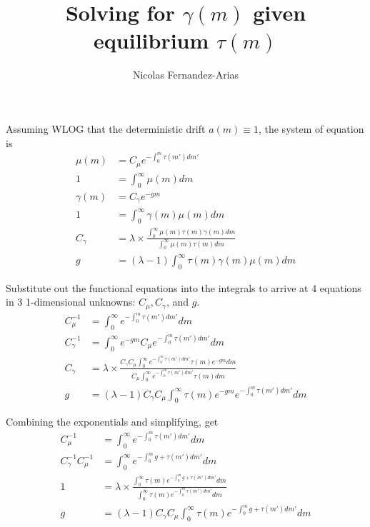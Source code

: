 \documentclass[12pt,english]{article}
\theoremstyle{remark}
\begin{document}
	
	\title{Solving for $\gamma(m)$ given equilibrium $\tau(m)$}
	\author{Nicolas Fernandez-Arias}
	\maketitle

Assuming WLOG that the deterministic drift $a(m) \equiv 1$, the system of equation is
\begin{align*}
	\mu(m) &= C_{\mu} e^{  -\int_{0}^{m} \tau(m') dm'} \\
	1 &= \int_{0}^{\infty} \mu(m) dm \\
	\gamma(m) &= C_{\gamma} e^{-gm} \\
	1 &= \int_{0}^{\infty}\gamma(m) \mu(m) dm \\ 
	C_{\gamma} &= \lambda \times \frac{\int_{0}^{\infty} \mu(m) \tau(m) \gamma(m) dm}{\int_{0}^{\infty} \mu(m) \tau(m)dm} \\
	g &= (\lambda -1) \int_{0}^{\infty} \tau(m) \gamma(m) \mu(m) dm
\end{align*}

Substitute out the functional equations into the integrals to arrive at 4 equations in 3 1-dimensional unknowns: $C_{\mu},C_{\gamma}$, and $g$.
\begin{align*}
	C_{\mu}^{-1} &= \int_{0}^{\infty} e^{ -\int_0^m \tau(m') dm'} dm \\
	C_{\gamma}^{-1} &= \int_{0}^{\infty} e^{-gm}  C_{\mu} e^{ - \int_0^m \tau(m') dm'} dm \\
	C_{\gamma} &= \lambda \times  \frac{ C_{\gamma} C_{\mu} \int_{0}^{\infty} e^{  -\int_{0}^{m} \tau(m') dm'}  \tau(m) e^{-gm} dm}{C_{\mu} \int_{0}^{\infty} e^ {  -\int_{0}^{m} \tau(m') dm'}  \tau(m) dm} \\
	g &= (\lambda -1) C_{\gamma} C_{\mu} \int_{0}^{\infty} \tau(m) e^{-gm} e^{  -\int_{0}^{m} \tau(m') dm'}   dm
\end{align*}

Combining the exponentials and simplifying, get
\begin{align*}
	C_{\mu}^{-1} &= \int_{0}^{\infty} e^{ -\int_0^m \tau(m') dm'} dm \\
C_{\gamma}^{-1}C_{\mu}^{-1} &= \int_{0}^{\infty} e^{-\int_0^m g + \tau(m') dm'} dm \\
1 &= \lambda \times  \frac{ \int_{0}^{\infty} \tau(m)e^{  -\int_{0}^{m} g + \tau(m') dm'}   dm}{\int_{0}^{\infty} \tau(m) e^{ -\int_{0}^{m} \tau(m') dm'} dm} \\
g &= (\lambda -1) C_{\gamma} C_{\mu} \int_{0}^{\infty} \tau(m) e^{  -\int_{0}^{m} g +  \tau(m') dm'}   dm
\end{align*}
\end{document}

